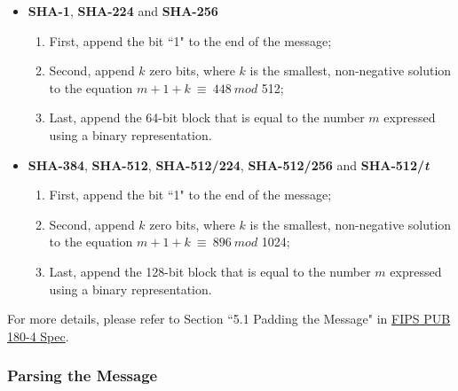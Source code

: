 \documentclass[main\_\_EN.tex]{subfiles}
\begin{document}
\begin{itemize}
    \item \textbf{SHA-1}, \textbf{SHA-224} and \textbf{SHA-256}
        \begin{enumerate}
        \item First, append the bit ``1" to the end of the message;
        \item Second, append \begin{math} k \end{math} zero bits, where \begin{math} k \end{math} is the smallest, non-negative solution to the equation \begin{math}m + 1 + k \ {\equiv} \ 448 \ mod \end{math} 512;
        \item Last, append the 64-bit block that is equal to the number \begin{math} m \end{math} expressed using a binary representation.
        \end{enumerate}
    \item \textbf{SHA-384}, \textbf{SHA-512}, \textbf{SHA-512/224}, \textbf{SHA-512/256} and \textbf{SHA-512/{\it{t}}}
        \begin{enumerate}
        \item First, append the bit ``1" to the end of the message;
        \item Second, append \begin{math} k \end{math} zero bits, where \begin{math} k \end{math} is the smallest, non-negative solution to the equation \begin{math}m + 1 + k \ {\equiv} \ 896 \ mod \end{math} 1024;
        \item Last, append the 128-bit block that is equal to the number \begin{math} m \end{math} expressed using a binary representation.
        \end{enumerate}
\end{itemize}

For more details, please refer to Section ``5.1 Padding the Message" in \href{https://doi.org/10.6028/NIST.FIPS.180-4}{FIPS PUB 180-4 Spec}.

\subsubsection{Parsing the Message}\label{parsingmessage}
\end{document}
